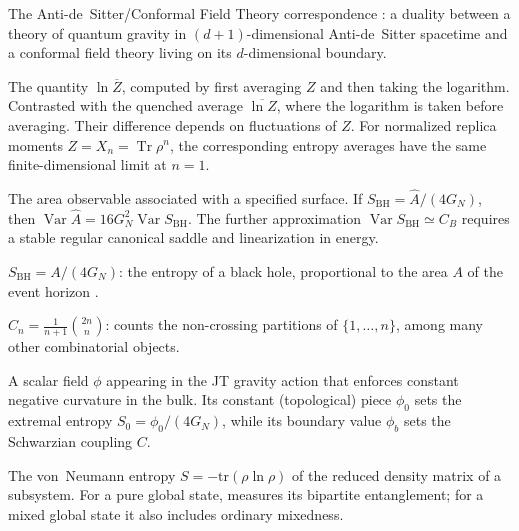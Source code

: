 \documentclass[11pt,letterpaper]{article}
\theoremstyle{plain}
\theoremstyle{definition}
\theoremstyle{remark}
\begin{document}
\begin{description}[style=nextline, leftmargin=2.5cm, labelwidth=2.3cm]

\item[AdS/CFT]
The Anti-de~Sitter/Conformal Field Theory correspondence
\cite{maldacena1998}: a duality between a theory of quantum gravity in
$(d+1)$-dimensional Anti-de~Sitter spacetime and a conformal field theory
living on its $d$-dimensional boundary.

\item[Annealed average]
The quantity $\ln \overline{Z}$, computed by first averaging $Z$ and then
taking the logarithm.  Contrasted with the quenched
average $\overline{\ln Z}$, where the logarithm is taken before averaging.
Their difference depends on fluctuations of $Z$.  For normalized replica
moments $Z=X_n=\operatorname{Tr}\rho^n$, the corresponding entropy averages
have the same finite-dimensional limit at $n=1$.

\item[Area operator]
The area observable associated with a specified surface.  If
$S_{\mathrm{BH}}=\hat A/(4G_N)$, then
$\operatorname{Var}\hat A=16G_N^2\operatorname{Var}S_{\mathrm{BH}}$.
The further approximation $\operatorname{Var}S_{\mathrm{BH}}\simeq C_B$
requires a stable regular canonical saddle and linearization in energy.

\item[Bekenstein--Hawking entropy]
$S_{\mathrm{BH}} = A/(4G_N)$: the entropy of a black hole, proportional to
the area $A$ of the event horizon \cite{bekenstein1973, hawking1975}.

\item[Catalan number]
$C_n = \frac{1}{n+1}\binom{2n}{n}$: counts the non-crossing partitions
of $\{1,\dots,n\}$, among many other combinatorial objects.

\item[Dilaton]
A scalar field $\phi$ appearing in the JT gravity action that enforces
constant negative curvature in the bulk.  Its constant (topological) piece
$\phi_0$ sets the extremal entropy $S_0 = \phi_0/(4G_N)$, while its boundary
value $\phi_b$ sets the Schwarzian coupling $C$.

\item[Entanglement entropy]
The von~Neumann entropy $S = -\mathrm{tr}(\rho \ln \rho)$ of the reduced
density matrix of a subsystem.  For a pure global state, measures its bipartite entanglement; for a
mixed global state it also includes ordinary mixedness.


\end{description}
\end{document}
